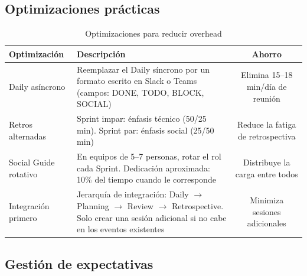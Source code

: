 \subsection{Optimizaciones prácticas}

\begin{table}[h]
    \centering
    \small
    \begin{tabularx}{\textwidth}{|l|X|c|}
        \hline
        \textbf{Optimización} & \textbf{Descripción}                                                                                     & \textbf{Ahorro} \\
        \hline
        Daily asíncrono
                              & Reemplazar el Daily síncrono por un formato escrito en Slack o Teams
        (campos: DONE, TODO, BLOCK, SOCIAL)
                              & Elimina 15--18 min/día de reunión                                                                                          \\
        \hline
        Retros alternadas
                              & Sprint impar: énfasis técnico (50/25 min). Sprint par: énfasis social (25/50 min)
                              & Reduce la fatiga de retrospectiva                                                                                          \\
        \hline
        Social Guide rotativo
                              & En equipos de 5--7 personas, rotar el rol cada Sprint.
        Dedicación aproximada: 10\% del tiempo cuando le corresponde
                              & Distribuye la carga entre todos                                                                                            \\
        \hline
        Integración primero
                              & Jerarquía de integración: Daily $\rightarrow$ Planning $\rightarrow$ Review $\rightarrow$ Retrospective.
        Solo crear una sesión adicional si no cabe en los eventos existentes
                              & Minimiza sesiones adicionales                                                                                              \\
        \hline
    \end{tabularx}
    \caption{Optimizaciones para reducir overhead}
    \label{tab:optimizaciones-overhead}
\end{table}
\FloatBarrier

\subsection{Gestión de expectativas}

